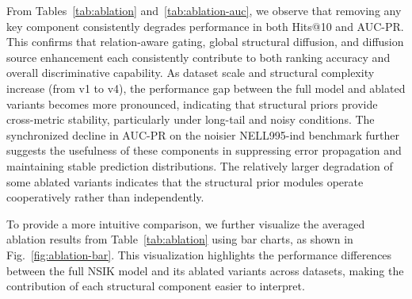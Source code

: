 \documentclass[preprint,12pt]{elsarticle}
\begin{document}
\begin{table}[ht]
\centering
\small
\caption{Ablation Study on Key Components of NSIK (AUC-PR, \%) over Inductive Benchmarks (v1--v4 and Avg.)}
\label{tab:ablation-auc}
\end{table}

From Tables~\ref{tab:ablation} and~\ref{tab:ablation-auc}, we observe that removing any key component consistently degrades performance in both Hits@10 and AUC-PR. This confirms that relation-aware gating, global structural diffusion, and diffusion source enhancement each consistently contribute to both ranking accuracy and overall discriminative capability. As dataset scale and structural complexity increase (from v1 to v4), the performance gap between the full model and ablated variants becomes more pronounced, indicating that structural priors provide cross-metric stability, particularly under long-tail and noisy conditions. The synchronized decline in AUC-PR on the noisier NELL995-ind benchmark further suggests the usefulness of these components in suppressing error propagation and maintaining stable prediction distributions. The relatively larger degradation of some ablated variants indicates that the structural prior modules operate cooperatively rather than independently.

To provide a more intuitive comparison, we further visualize the averaged ablation results from Table~\ref{tab:ablation} using bar charts, as shown in Fig.~\ref{fig:ablation-bar}. This visualization highlights the performance differences between the full NSIK model and its ablated variants across datasets, making the contribution of each structural component easier to interpret.
\end{document}
